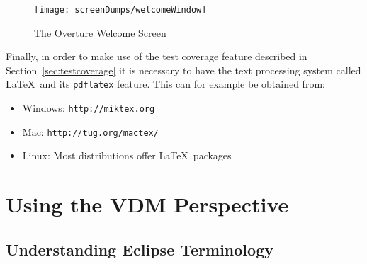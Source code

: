 \documentclass{overturerepchap}
\newcommand{\url}[1]{\texttt{#1}}
\begin{document}
\begin{figure}[!htb]
\begin{center}
  \texttt{[image: screenDumps/welcomeWindow]}
  \caption{The Overture Welcome Screen}
  \label{fig:userguire:welcomeWindow}
\end{center}
\end{figure}



Finally, in order to make use of the
test coverage feature described in Section~\ref{sec:testcoverage} it is
necessary to have the text processing system called \LaTeX\ and its
\texttt{pdflatex} feature. This can for example be obtained from:

\begin{itemize}
    \item Windows: \url{http://miktex.org}
    \item Mac: \url{http://tug.org/mactex/}
    \item Linux: Most distributions offer \LaTeX\ packages
\end{itemize}

\chapter{Using the VDM Perspective}\label{sec:vdmsupport}

\section{Understanding Eclipse Terminology}
\end{document}
